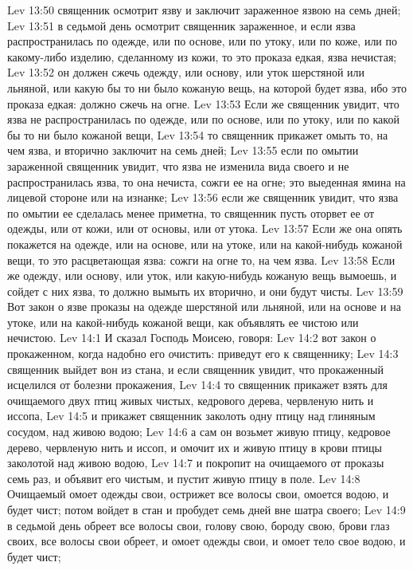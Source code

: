 \vs Lev 13:50 священник осмотрит язву и заключит зараженное язвою на семь дней;
\vs Lev 13:51 в седьмой день осмотрит священник зараженное, и если язва распространилась по одежде, или по основе, или по утоку, или по коже, или по какому-либо изделию, сделанному из кожи, то это проказа едкая, язва нечистая;
\vs Lev 13:52 он должен сжечь одежду, или основу, или уток шерстяной или льняной, или какую бы то ни было кожаную вещь, на которой будет язва, ибо это проказа едкая: должно сжечь на огне.
\vs Lev 13:53 Если же священник увидит, что язва не распространилась по одежде, или по основе, или по утоку, или по какой бы то ни было кожаной вещи,
\vs Lev 13:54 то священник прикажет омыть то, на чем язва, и вторично заключит на семь дней;
\vs Lev 13:55 если по омытии зараженной  священник увидит, что язва не изменила вида своего и не распространилась язва, то она нечиста, сожги ее на огне; это выеденная ямина на лицевой стороне или на изнанке;
\vs Lev 13:56 если же священник увидит, что язва по омытии ее сделалась менее приметна, то священник пусть оторвет ее от одежды, или от кожи, или от основы, или от утока.
\vs Lev 13:57 Если же она опять покажется на одежде, или на основе, или на утоке, или на какой-нибудь кожаной вещи, то это расцветающая язва: сожги на огне то, на чем язва.
\vs Lev 13:58 Если же одежду, или основу, или уток, или какую-нибудь кожаную вещь вымоешь, и сойдет с них язва, то должно вымыть их вторично, и они будут чисты.
\vs Lev 13:59 Вот закон о язве проказы на одежде шерстяной или льняной, или на основе и на утоке, или на какой-нибудь кожаной вещи, как объявлять ее чистою или нечистою.
\vs Lev 14:1 И сказал Господь Моисею, говоря:
\vs Lev 14:2 вот закон о прокаженном, когда надобно его очистить: приведут его к священнику;
\vs Lev 14:3 священник выйдет вон из стана, и если священник увидит, что прокаженный исцелился от болезни прокажения,
\vs Lev 14:4 то священник прикажет взять для очищаемого двух птиц живых чистых, кедрового дерева, червленую нить и иссопа,
\vs Lev 14:5 и прикажет священник заколоть одну птицу над глиняным сосудом, над живою водою;
\vs Lev 14:6 а сам он возьмет живую птицу, кедровое дерево, червленую нить и иссоп, и омочит их и живую птицу в крови птицы заколотой над живою водою,
\vs Lev 14:7 и покропит на очищаемого от проказы семь раз, и объявит его чистым, и пустит живую птицу в поле.
\vs Lev 14:8 Очищаемый омоет одежды свои, острижет все волосы свои, омоется водою, и будет чист; потом войдет в стан и пробудет семь дней вне шатра своего;
\vs Lev 14:9 в седьмой день обреет все волосы свои, голову свою, бороду свою, брови глаз своих, все волосы свои обреет, и омоет одежды свои, и омоет тело свое водою, и будет чист;

